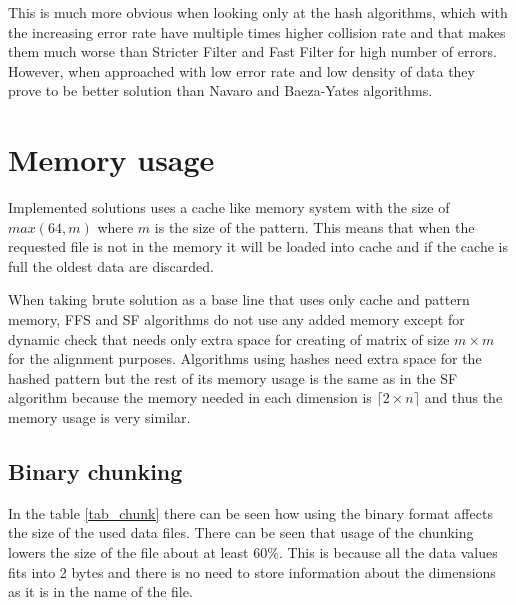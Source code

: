 This is much more obvious when looking only at the hash algorithms, which with the increasing error rate have multiple times higher collision rate and that makes them much worse than Stricter Filter and Fast Filter for high number of errors. However, when approached with low error rate and low density of data they prove to be better solution than Navaro and Baeza-Yates algorithms.

\section{Memory usage}
Implemented solutions uses a cache like memory system with the size of $max(64, m)$ where $m$ is the size of the pattern. This means that when the requested file is not in the memory it will be loaded into cache and if the cache is full the oldest data are discarded. 

When taking brute solution as a base line that uses only cache and pattern memory, FFS and SF algorithms do not use any added memory except for dynamic check that needs only extra space for creating of matrix of size $m\times m$ for the alignment purposes. Algorithms using hashes need extra space for the hashed pattern but the rest of its memory usage is the same as in the SF algorithm because the memory needed in each dimension is $\lceil 2\times n\rceil$ and thus the memory usage is very similar. %

\subsection{Binary chunking}
In the table \ref{tab_chunk} there can be seen how using the binary format affects the size of the used data files. There can be seen that usage of the chunking lowers the size of the file about at least $60 \%$. This is because all the data values fits into 2 bytes and there is no need to store information about the dimensions as it is in the name of the file. 

